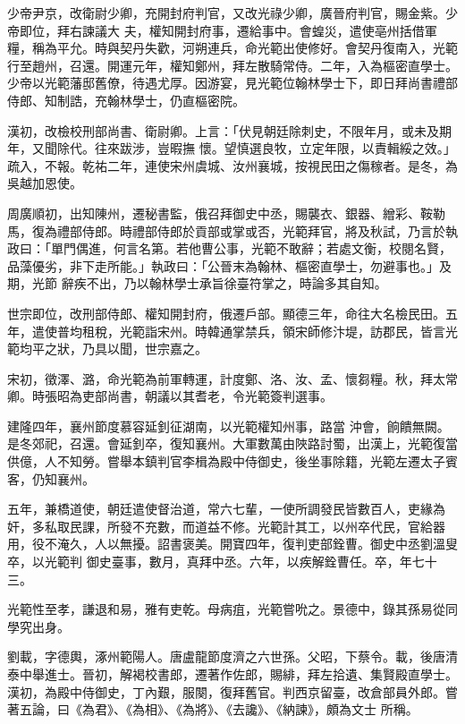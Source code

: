 \begin{pinyinscope}
 少帝尹京，改衛尉少卿，充開封府判官，又改光祿少卿，廣晉府判官，賜金紫。少帝即位，拜右諫議大
 夫，權知開封府事，遷給事中。會蝗災，遣使亳州括借軍糧，稱為平允。時與契丹失歡，河朔連兵，命光範出使修好。會契丹復南入，光範行至趙州，召還。開運元年，權知鄭州，拜左散騎常侍。二年，入為樞密直學士。少帝以光範藩邸舊僚，待遇尤厚。因游宴，見光範位翰林學士下，即日拜尚書禮部侍郎、知制誥，充翰林學士，仍直樞密院。



 漢初，改檢校刑部尚書、衛尉卿。上言：「伏見朝廷除刺史，不限年月，或未及期年，又聞除代。往來跋涉，豈暇撫
 懷。望慎選良牧，立定年限，以責輯綏之效。」疏入，不報。乾祐二年，連使宋州虞城、汝州襄城，按視民田之傷稼者。是冬，為吳越加恩使。



 周廣順初，出知陳州，遷秘書監，俄召拜御史中丞，賜襲衣、銀器、繒彩、鞍勒馬，復為禮部侍郎。時禮部侍郎於貢部或掌或否，光範拜官，將及秋試，乃言於執政曰：「單門偶進，何言名第。若他曹公事，光範不敢辭；若處文衡，校閱名賢，品藻優劣，非下走所能。」執政曰：「公晉末為翰林、樞密直學士，勿避事也。」及期，光節
 辭疾不出，乃以翰林學士承旨徐臺符掌之，時論多其自知。



 世宗即位，改刑部侍郎、權知開封府，俄遷戶部。顯德三年，命往大名檢民田。五年，遣使普均租稅，光範詣宋州。時韓通掌禁兵，領宋師修汴堤，訪郡民，皆言光範均平之狀，乃具以聞，世宗嘉之。



 宋初，徵澤、潞，命光範為前軍轉運，計度鄭、洛、汝、孟、懷芻糧。秋，拜太常卿。時張昭為吏部尚書，朝議以其耆老，令光範簽判選事。



 建隆四年，襄州節度慕容延釗征湖南，以光範權知州事，路當
 沖會，餉饋無闕。是冬郊祀，召還。會延釗卒，復知襄州。大軍數萬由陜路討蜀，出漢上，光範復當供億，人不知勞。嘗舉本鎮判官李楫為殿中侍御史，後坐事除籍，光範左遷太子賓客，仍知襄州。



 五年，兼橋道使，朝廷遣使督治道，常六七輩，一使所調發民皆數百人，吏緣為奸，多私取民課，所發不充數，而道益不修。光範計其工，以州卒代民，官給器用，役不淹久，人以無擾。詔書褒美。開寶四年，復判吏部銓曹。御史中丞劉溫叟卒，以光範判
 御史臺事，數月，真拜中丞。六年，以疾解銓曹任。卒，年七十三。



 光範性至孝，謙退和易，雅有吏乾。母病疽，光範嘗吮之。景德中，錄其孫易從同學究出身。



 劉載，字德輿，涿州範陽人。唐盧龍節度濟之六世孫。父昭，下蔡令。載，後唐清泰中舉進士。晉初，解褐校書郎，遷著作佐郎，賜緋，拜左拾遺、集賢殿直學士。漢初，為殿中侍御史，丁內艱，服闋，復拜舊官。判西京留臺，改倉部員外郎。嘗著五論，曰《為君》、《為相》、《為將》、《去讒》、《納諫》，頗為文士
 所稱。




\end{pinyinscope}

